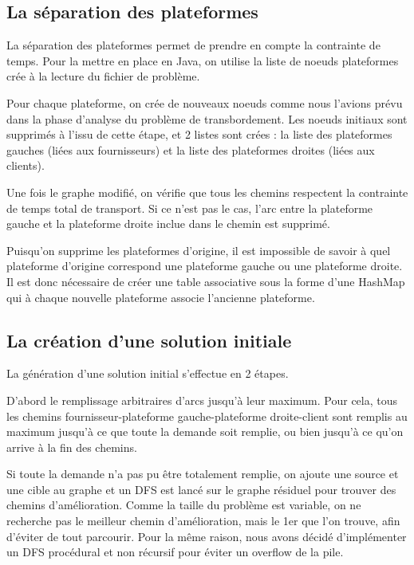 \documentclass[a4paper,12pt]{article}
\begin{document}
\subsection{La s\'eparation des plateformes}

La s\'eparation des plateformes permet de prendre en compte la contrainte de temps. Pour la mettre en place en Java, on utilise la liste de noeuds plateformes crée à la lecture du fichier de problème.

Pour chaque plateforme, on crée de nouveaux noeuds comme nous l'avions prévu dans la phase d'analyse du problème de transbordement. Les noeuds initiaux sont supprimés à l'issu de cette étape, et 2 listes sont crées : la liste des plateformes gauches (liées aux fournisseurs) et la liste des plateformes droites (liées aux clients).

Une fois le graphe modifié, on vérifie que tous les chemins respectent la contrainte de temps total de transport. Si ce n'est pas le cas, l'arc entre la plateforme gauche et la plateforme droite inclue dans le chemin est supprimé.

Puisqu'on supprime les plateformes d'origine, il est impossible de savoir à quel plateforme d'origine correspond une plateforme gauche ou une plateforme droite. Il est donc nécessaire de créer une table associative sous la forme d'une HashMap qui à chaque nouvelle plateforme associe l'ancienne plateforme.

\subsection{La cr\'eation d'une solution initiale}

La génération d'une solution initial s'effectue en 2 étapes.

D'abord le remplissage arbitraires d'arcs jusqu'à leur maximum. Pour cela, tous les chemins fournisseur-plateforme gauche-plateforme droite-client sont remplis au maximum jusqu'à ce que toute la demande soit remplie, ou bien jusqu'à ce qu'on arrive à la fin des chemins.

Si toute la demande n'a pas pu être totalement remplie, on ajoute une source et une cible au graphe et un DFS est lancé sur le graphe résiduel pour trouver des chemins d'amélioration. Comme la taille du problème est variable, on ne recherche pas le meilleur chemin d'amélioration, mais le 1er que l'on trouve, afin d'éviter de tout parcourir. Pour la même raison, nous avons décidé d'implémenter un DFS procédural et non récursif pour éviter un overflow de la pile. 
\end{document}
